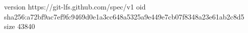 version https://git-lfs.github.com/spec/v1
oid sha256:a72bf9ac7ef9fc9469d0e1a3cc648a5325a9e449e7cb07f8348a23e61ab2c8d5
size 43840
